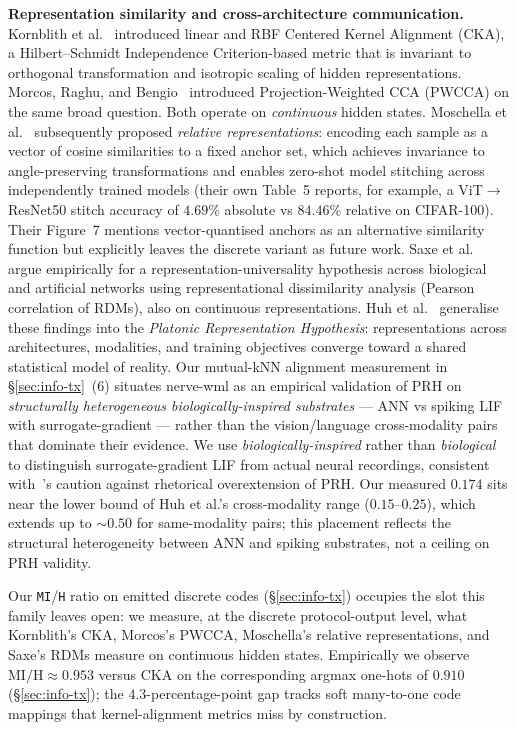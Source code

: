 \documentclass[10pt,twocolumn]{article}
\begin{document}
\textbf{Representation similarity and cross-architecture communication.} Kornblith et al.~\cite{kornblith2019similarity} introduced linear and RBF Centered Kernel Alignment (CKA), a Hilbert--Schmidt Independence Criterion-based metric that is invariant to orthogonal transformation and isotropic scaling of hidden representations. Morcos, Raghu, and Bengio~\cite{morcos2018insights} introduced Projection-Weighted CCA (PWCCA) on the same broad question. Both operate on \emph{continuous} hidden states. Moschella et al.~\cite{moschella2022relative} subsequently proposed \emph{relative representations}: encoding each sample as a vector of cosine similarities to a fixed anchor set, which achieves invariance to angle-preserving transformations and enables zero-shot model stitching across independently trained models (their own Table~5 reports, for example, a ViT$\to$ResNet50 stitch accuracy of $4.69\%$ absolute vs $84.46\%$ relative on CIFAR-100). Their Figure~7 mentions vector-quantised anchors as an alternative similarity function but explicitly leaves the discrete variant as future work. Saxe et al.~\cite{saxe2024universality} argue empirically for a representation-universality hypothesis across biological and artificial networks using representational dissimilarity analysis (Pearson correlation of RDMs), also on continuous representations. Huh et al.~\cite{huh2024platonic} generalise these findings into the \emph{Platonic Representation Hypothesis}: representations across architectures, modalities, and training objectives converge toward a shared statistical model of reality. Our mutual-kNN alignment measurement in \S\ref{sec:info-tx}~(6) situates nerve-wml as an empirical validation of PRH on \emph{structurally heterogeneous biologically-inspired substrates} --- ANN vs spiking LIF with surrogate-gradient --- rather than the vision/language cross-modality pairs that dominate their evidence. We use \emph{biologically-inspired} rather than \emph{biological} to distinguish surrogate-gradient LIF from actual neural recordings, consistent with~\cite{aristotelianprh2026}'s caution against rhetorical overextension of PRH. Our measured $0.174$ sits near the lower bound of Huh et al.'s cross-modality range ($0.15$--$0.25$), which extends up to $\sim 0.50$ for same-modality pairs; this placement reflects the structural heterogeneity between ANN and spiking substrates, not a ceiling on PRH validity.

Our \texttt{MI}/\texttt{H} ratio on emitted discrete codes (\S\ref{sec:info-tx}) occupies the slot this family leaves open: we measure, at the discrete protocol-output level, what Kornblith's CKA, Morcos's PWCCA, Moschella's relative representations, and Saxe's RDMs measure on continuous hidden states. Empirically we observe $\mathrm{MI}/\mathrm{H} \approx 0.953$ versus $\mathrm{CKA}$ on the corresponding argmax one-hots of $0.910$ (\S\ref{sec:info-tx}); the $4.3$-percentage-point gap tracks soft many-to-one code mappings that kernel-alignment metrics miss by construction.
\end{document}
